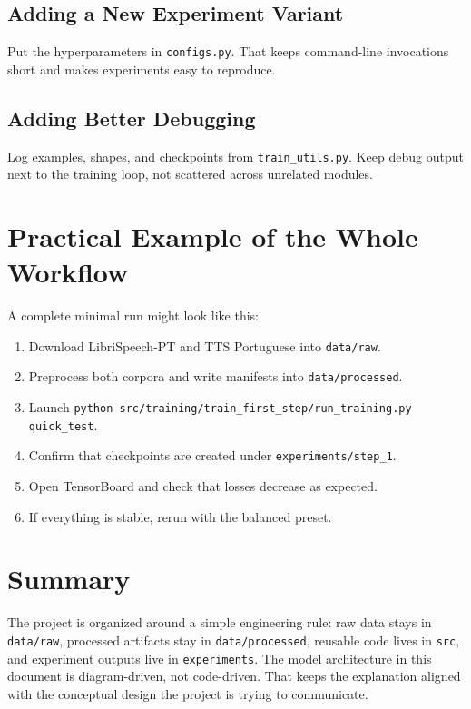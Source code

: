 \documentclass[11pt]{article}
\newcommand{\pathtt}[1]{\texttt{#1}}
\begin{document}
\subsection{Adding a New Experiment Variant}

Put the hyperparameters in \pathtt{configs.py}. That keeps command-line invocations short and makes experiments easy to reproduce.

\subsection{Adding Better Debugging}

Log examples, shapes, and checkpoints from \pathtt{train\_utils.py}. Keep debug output next to the training loop, not scattered across unrelated modules.

\section{Practical Example of the Whole Workflow}

A complete minimal run might look like this:

\begin{enumerate}[leftmargin=1.5em]
  \item Download LibriSpeech-PT and TTS Portuguese into \pathtt{data/raw}.
  \item Preprocess both corpora and write manifests into \pathtt{data/processed}.
  \item Launch \pathtt{python src/training/train\_first\_step/run\_training.py quick\_test}.
  \item Confirm that checkpoints are created under \pathtt{experiments/step\_1}.
  \item Open TensorBoard and check that losses decrease as expected.
  \item If everything is stable, rerun with the balanced preset.
\end{enumerate}

\section{Summary}

The project is organized around a simple engineering rule: raw data stays in \pathtt{data/raw}, processed artifacts stay in \pathtt{data/processed}, reusable code lives in \pathtt{src}, and experiment outputs live in \pathtt{experiments}. The model architecture in this document is diagram-driven, not code-driven. That keeps the explanation aligned with the conceptual design the project is trying to communicate.
\end{document}
